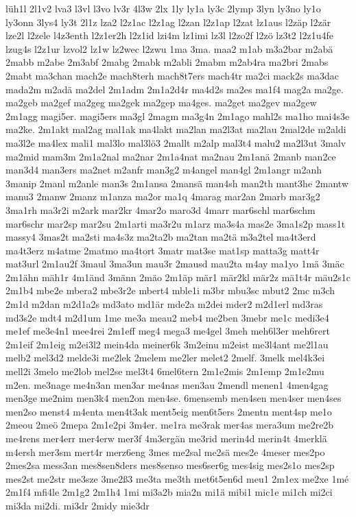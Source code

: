 {lüh1l
2l1v2
lva3
l3vl
l3vo
lv3r
4l3w
2lx
1ly
ly1a
ly3c
2lymp
3lyn
ly3no
ly1o
ly3onn
3lys4
ly3t
2l1z
lza2
l2z1ac
l2z1ag
l2zan
l2z1ap
l2zat
lz1aus
l2zäp
l2zär
lze2l
l2zele
l4z3enth
l2z1er2h
l2z1id
lzi4m
lz1imi
lz3l
l2zo2f
l2zö
lz3t2
l2z1u4fe
lzug4s
l2z1ur
lzvol2
lz1w
lz2wec
l2zwu
1ma
3ma.
maa2
m1ab
m3a2bar
m2abä
2mabb
m2abe
2m3abf
2mabg
2mabk
m2abli
2mabm
m2ab4ra
ma2bri
2mabs
2mabt
ma3chan
mach2e
mach8terh
mach8t7ers
mach4tr
ma2ci
mack2s
ma3dac
mada2m
m2adä
ma2del
2m1adm
2m1a2d4r
ma4d2s
ma2es
ma1f4
mag2a
ma2ge.
ma2geb
ma2gef
ma2geg
ma2gek
ma2gep
ma4ges.
ma2get
ma2gev
ma2gew
2m1agg
magi5er.
magi5ers
ma3gl
2magm
ma3g4n
2m1ago
mahl2s
ma1ho
mai4s3e
ma2ke.
2m1akt
mal2ag
mal1ak
ma4lakt
ma2lan
ma2l3at
ma2lau
2mal2de
m2aldi
ma3l2e
ma4lex
mali1
mal3lo
mal3lö3
2mallt
m2alp
mal3t4
malu2
ma2l3ut
3malv
ma2mid
mam3m
2m1a2nal
ma2nar
2m1a4nat
ma2nau
2m1anä
2manb
man2ce
man3d4
man3ers
ma2net
m2anfr
man3g2
m4angel
man4gl
2m1angr
m2anh
3manip
2manl
m2anle
man3s
2m1ansa
2mansä
man4sh
man2th
mant3he
2mantw
manu3
2manw
2manz
m1anza
ma2or
ma1q
4marag
mar2an
2marb
mar3g2
3ma1rh
ma3r2i
m2ark
mar2kr
4mar2o
maro3d
4marr
mar6schl
mar6schm
mar6schr
mar2sp
mar2su
2m1arti
ma3r2u
m1arz
ma3s4a
mas2e
3ma1s2p
mass1t
massy4
3mas2t
ma2sti
ma4s3z
ma2ta2b
ma2tan
ma2tä
m3a2tel
ma4t3erd
ma4t3erz
m4atme
2matmo
ma4tort
3matr
mat3se
mat1sp
matta3g
matt4r
mat3url
2m1au2f
3maul
3ma3un
mau3r
2mausd
mau2ta
m4ay
ma1yo
1mä
3mäc
2m1ähn
mäh1r
4m1änd
3männ
2mäo
2m1äp
mär1
mär2kl
mär2z
mä1t4r
mäu2s1c
2m1b4
mbe2e
mbera2
mbe3r2e
mbert4
mble1i
m3br
mbu3sc
mbut2
2mc
m3ch
2m1d
m2dan
m2d1a2s
md3ato
md1är
mde2a
m2dei
mder2
m2d1erl
md3ras
md3s2e
mdt4
m2d1um
1me
me3a
meau2
meb4
me2ben
3mebr
me1c
medi3e4
me1ef
me3e4n1
mee4rei
2m1eff
meg4
mega3
me4gel
3meh
meh6l3er
meh6rert
2m1eif
2m1eig
m2ei3l2
mein4da
meiner6k
3m2einu
m2eist
me3l4ant
me2l1au
melb2
mel3d2
melde3i
me2lek
2melem
me2ler
melet2
2melf.
3melk
mel4k3ei
mell2i
3melo
me2lob
mel2se
mel3t4
6mel6tern
2m1e2mis
2m1emp
2m1e2mu
m2en.
me3nage
me4n3an
men3ar
me4nas
men3au
2mendl
menen1
4men4gag
men3ge
me2nim
men3k4
men2on
men4se.
6mensemb
men4sen
men4ser
men4ses
men2so
menst4
m4enta
men4t3ak
ment5eig
men6t5ers
2mentn
ment4sp
me1o
2meou
2meö
2mepa
2m1e2pi
3m4er.
me1ra
me3rak
mer4as
mera3um
me2re2b
me4rens
mer4err
mer4erw
mer3f
4m3ergän
me3rid
merin4d
merin4t
4merklä
m4ersh
mer3sm
mert4r
merz6eng
3mes
me2sal
me2sä
mes2e
4meser
mes2po
2mes2sa
mess3an
mes8sen8ders
mes8senso
mes6ser6g
mes4sig
mes2s1o
mes2sp
mes2st
me2str
me3sze
3me2ß3
me3ta
me3th
met6t5en6d
meu1
2m1ex
me2xe
1mé
2m1f4
mfi4le
2m1g2
2m1h4
1mi
mi3a2b
mia2n
mi1ä
mibi1
mic1e
mi1ch
mi2ci
mi3da
mi2di.
mi3dr
2midy
mie3dr
}
